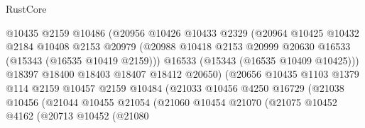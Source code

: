 \begin{lexlean}{RustCore}
\begin{coremodule}
                                  @10435
                                  @2159
                                  @10486
                                  (@20956
                                    @10426
                                    @10433
                                    @2329
                                    (@20964
                                      @10425
                                      @10432
                                      @2184
                                      @10408
                                      @2153
                                      @20979
                                      (@20988
                                        @10418
                                        @2153
                                        @20999
                                        @20630
                                        @16533
                                        (@15343 (@16535 @10419 @2159)))
                                      @16533
                                      (@15343 (@16535 @10409 @10425)))
                                    @18397
                                    @18400
                                    @18403
                                    @18407
                                    @18412
                                    @20650)
                                  (@20656
                                    @10435
                                    @1103
                                    @1379
                                    @114
                                    @2159
                                    @10457
                                    @2159
                                    @10484
                                    (@21033
                                      @10456
                                      @4250
                                      @16729
                                      (@21038
                                        @10456
                                        (@21044
                                          @10455
                                          @21054
                                          (@21060
                                            @10454
                                            @21070
                                            (@21075
                                              @10452
                                              @4162
                                              (@20713
                                                @10452
                                                (@21080

\end{coremodule}
\end{lexlean}
